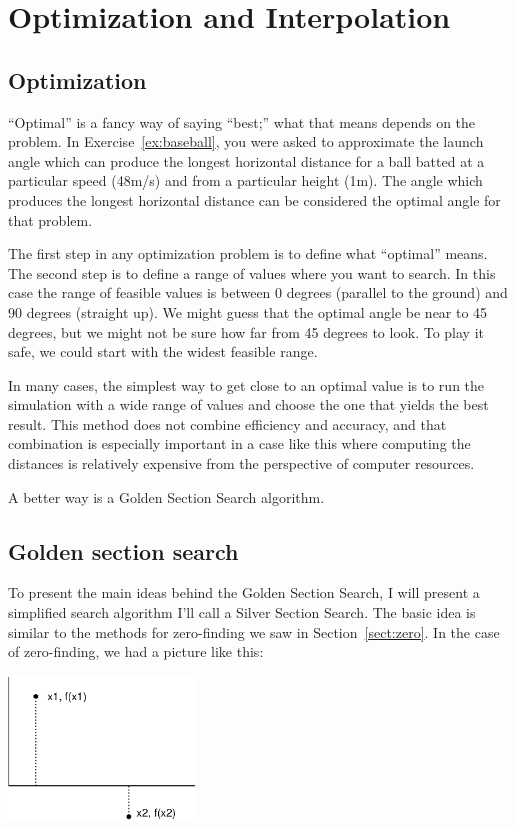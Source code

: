 \documentclass[
]{book}
\numberwithin{Answer}{chapter}
\numberwithin{Exercise}{chapter}
\begin{document}
\chapter{Optimization and Interpolation}
\section{Optimization}

``Optimal'' is a fancy way of saying ``best;'' what that means depends on the problem.
In Exercise~\ref{ex:baseball}, you were asked to approximate the launch angle which
can produce the longest horizontal distance for a ball batted at a particular speed (48m/s)
and from a particular height (1m).  The angle which produces the longest horizontal distance
can be considered the
optimal angle for that problem.

The first step in any optimization problem is to define
what ``optimal'' means.  The second step is to define a range of
values where you want to search. In this case the range of
feasible values is between 0 degrees (parallel to the ground)
and 90 degrees (straight up).  We might guess that the
optimal angle be near to 45 degrees, but we might not be sure
how far from 45 degrees to look.  To play it safe, we could
start with the widest feasible range.

In many cases,
the simplest way to get close to an optimal value is to run the
simulation with a wide range of values and choose the one
that yields the best result.  This
method does not combine efficiency and accuracy,
and that combination is especially important in a case like this where
computing the distances is relatively expensive from the perspective
of computer resources.

A better way is a Golden Section Search algorithm.

\section{Golden section search}

To present the main ideas behind
the Golden Section Search, I will present a simplified
search algorithm I'll call a Silver Section Search.  The basic idea is similar to
the methods for zero-finding we saw in Section~\ref{sect:zero}.  In the
case of zero-finding, we had a picture like this:

\beforefig \centerline{\includegraphics[height=1.5in]{figs/secant.eps}}
\end{document}
